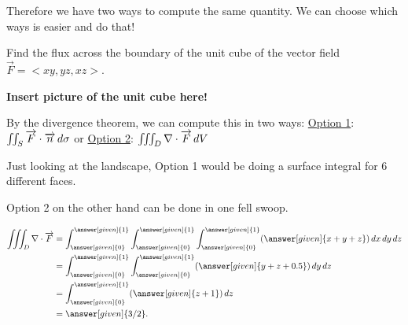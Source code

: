 \documentclass{ximera}
\begin{document}
Therefore we have two ways to compute the same  quantity. We can choose which ways is easier and do that!

\begin{example}
Find the flux across the boundary of the unit cube of the vector field $\overrightarrow{F} = <xy,yz,xz>$.

{\bf Insert picture of the unit cube here!}

\begin{explanation}
By the divergence theorem, we can compute this in two ways:
\underline{Option 1}: $\iint_S \overrightarrow{F} \cdot \overrightarrow{n} \mathop{}\!d \sigma$
or \underline{Option 2}: $\iiint_D \nabla\cdot \overrightarrow{F} \mathop{}\!d V$

Just looking at the landscape, Option 1 would be doing a surface integral for 6 different faces.

Option 2 on the other hand can be done in one fell swoop.

    \begin{align*}
     \iiint_D \nabla \cdot  \overrightarrow{F} &= \int_{\answer[given]{0}}^{\answer[given]{1}} \int_{\answer[given]{0}}^{\answer[given]{1}} \int_{\answer[given]{0}}^{\answer[given]{1}} (\answer[given]{x+y+z}) \d x \d y \d z \\
     &= \int_{\answer[given]{0}}^{\answer[given]{1}} \int_{\answer[given]{0}}^{\answer[given]{1}} (\answer[given]{y + z + 0.5}) \d y \d z \\
     &= \int_{\answer[given]{0}}^{\answer[given]{1}} (\answer[given]{z + 1})\d z\\
     &= \answer[given]{3/2}.
    \end{align*}
\end{explanation}


\end{example}




\end{document}
